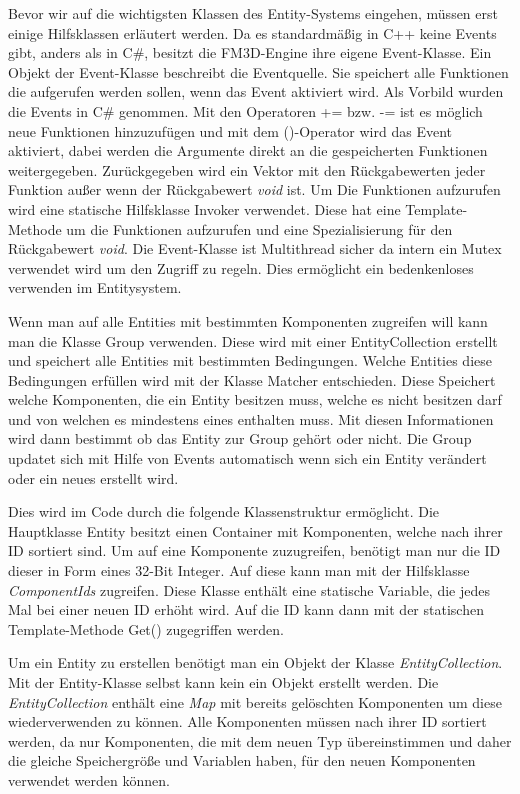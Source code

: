Bevor wir auf die wichtigsten Klassen des Entity-Systems eingehen, müssen erst einige Hilfsklassen erläutert werden.
Da es standardmäßig in C++ keine Events gibt, anders als in C\#, besitzt die FM3D-Engine ihre eigene Event-Klasse. Ein Objekt der Event-Klasse beschreibt die Eventquelle. Sie speichert alle Funktionen die aufgerufen werden sollen, wenn das Event aktiviert wird. Als Vorbild wurden die Events in C\# genommen. Mit den Operatoren += bzw. -= ist es möglich neue Funktionen hinzuzufügen und mit dem ()-Operator wird das Event aktiviert, dabei werden die Argumente direkt an die gespeicherten Funktionen weitergegeben. Zurückgegeben wird ein Vektor mit den Rückgabewerten jeder Funktion außer wenn der Rückgabewert \textit{void} ist. Um Die Funktionen aufzurufen wird eine statische Hilfsklasse Invoker verwendet. Diese hat eine Template-Methode um die Funktionen aufzurufen und eine Spezialisierung für den Rückgabewert \textit{void}. Die Event-Klasse ist Multithread sicher da intern ein Mutex verwendet wird um den Zugriff zu regeln. Dies ermöglicht ein bedenkenloses verwenden im Entitysystem.

Wenn man auf alle Entities mit bestimmten Komponenten zugreifen will kann man die Klasse Group verwenden. Diese wird mit einer EntityCollection erstellt und speichert alle Entities mit bestimmten Bedingungen. Welche Entities diese Bedingungen erfüllen wird mit der Klasse Matcher entschieden. Diese Speichert welche Komponenten, die ein Entity besitzen muss, welche es nicht besitzen darf und von welchen es mindestens eines enthalten muss. Mit diesen Informationen wird dann bestimmt ob das Entity zur Group gehört oder nicht. Die Group updatet sich mit Hilfe von Events automatisch wenn sich ein Entity verändert oder ein neues erstellt wird.

Dies wird im Code durch die folgende Klassenstruktur ermöglicht. Die Hauptklasse Entity besitzt einen Container mit Komponenten, welche nach ihrer ID sortiert sind. Um auf eine Komponente zuzugreifen, benötigt man nur die ID dieser in Form eines 32-Bit Integer. Auf diese kann man mit der Hilfsklasse \textit{ComponentIds} zugreifen. 
Diese Klasse enthält eine statische Variable, die jedes Mal bei einer neuen ID erhöht wird. Auf die ID kann dann mit der statischen Template-Methode Get() zugegriffen werden.
 
Um ein Entity zu erstellen benötigt man ein Objekt der Klasse \textit{EntityCollection}. Mit der Entity-Klasse selbst kann kein ein Objekt erstellt werden.  
Die \textit{EntityCollection} enthält eine \textit{Map} mit bereits gelöschten Komponenten um diese wiederverwenden zu können. 
Alle Komponenten müssen nach ihrer ID sortiert werden, da nur Komponenten, die mit dem neuen Typ übereinstimmen und daher die gleiche Speichergröße und Variablen haben, für den neuen Komponenten verwendet werden können.

